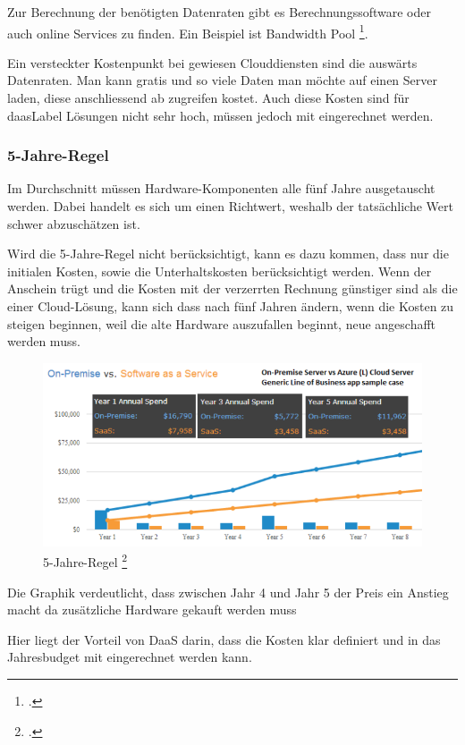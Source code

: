 Zur Berechnung der benötigten Datenraten gibt es Berechnungssoftware oder auch online Services zu finden. Ein Beispiel ist Bandwidth Pool \footcite{What_is_Bandwidth_Pool_Bandwidth_Pool_2014-12-22}.

Ein versteckter Kostenpunkt bei gewiesen Clouddiensten sind die auswärts Datenraten. Man kann gratis und so viele Daten man möchte auf einen Server laden, diese anschliessend ab zugreifen kostet.
Auch diese Kosten sind für \Gls{daasLabel} Lösungen nicht sehr hoch, müssen jedoch mit eingerechnet werden.

\subsubsection{5-Jahre-Regel}
Im Durchschnitt müssen Hardware-Komponenten alle fünf Jahre ausgetauscht werden. Dabei handelt es sich um einen Richtwert, weshalb der tatsächliche Wert schwer abzuschätzen ist.

Wird die 5-Jahre-Regel nicht berücksichtigt, kann es dazu kommen, dass nur die initialen Kosten, sowie die Unterhaltskosten berücksichtigt werden.
Wenn der Anschein trügt und die Kosten mit der verzerrten Rechnung günstiger sind als die einer Cloud-Lösung, kann sich dass nach fünf Jahren ändern, wenn die Kosten zu steigen beginnen, weil die alte Hardware auszufallen beginnt, neue angeschafft werden muss.

\begin{figure}[H]
	\includegraphics[width=\textwidth]{images/five-year-rule}
	\caption{5-Jahre-Regel \footcite{Comparing_cloud_vs_on-premise_Six_hidden_costs_people_always_forget_about_2014-12-16}}
	\label{fig:fiveYearRuleImage}
\end{figure}
Die Graphik verdeutlicht, dass zwischen Jahr 4 und Jahr 5 der Preis ein Anstieg macht da zusätzliche Hardware gekauft werden muss

Hier liegt der Vorteil von DaaS darin, dass die Kosten klar definiert und in das Jahresbudget mit eingerechnet werden kann.

